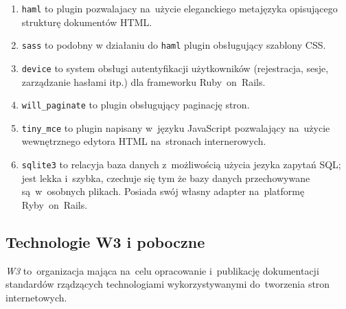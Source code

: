 \begin{enumerate}
  \item \texttt{haml}\cite{haml} to plugin pozwalajacy na~użycie eleganckiego metajęzyka opisującego strukturę dokumentów HTML.
  \item \texttt{sass}\cite{sass} to podobny w działaniu do \texttt{haml} plugin obsługujący szablony CSS.
  \item \texttt{device}\cite{devise} to system obsługi autentyfikacji użytkowników (rejestracja, sesje, zarządzanie hasłami itp.) dla frameworku Ruby~on~Rails.
  \item \texttt{will\_paginate}\cite{will.paginate} to plugin obsługujący paginację stron.
  \item \texttt{tiny\_mce}\cite{tiny.mce} to plugin napisany w~języku JavaScript pozwalający na~użycie wewnętrznego edytora HTML na~stronach internerowych.
  \item \texttt{sqlite3}\cite{sqlite3} to relacyja baza danych z~możliwością użycia jezyka zapytań SQL; jest lekka i~szybka, czechuje się tym że bazy danych przechowywane są~w~osobnych plikach. Posiada swój własny adapter na~platformę Ryby~on~Rails.
\end{enumerate}


\subsection{Technologie W3 i poboczne} \label{technologie.web}

\textit{W3}\cite{w3} to~organizacja mająca na~celu opracowanie i~publikację dokumentacji standardów rządzących technologiami wykorzystywanymi do~tworzenia stron internetowych.


